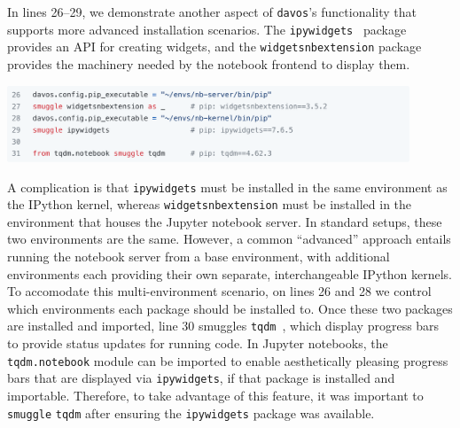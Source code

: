 \documentclass[preprint,12pt,a4paper]{elsarticle}
\begin{document}
In lines 26--29, we demonstrate another aspect of \texttt{davos}'s
functionality that supports more advanced installation scenarios.  The
\texttt{ipywidgets}~\cite{FredEtal15} package provides an API for
creating widgets, and the \texttt{widgetsnbextension} package provides
the machinery needed by the notebook frontend to display them.
\begin{center}
\includegraphics[width=0.9\textwidth]{figs/example6}
\end{center}
A complication is that \texttt{ipywidgets} must be installed in the
same environment as the IPython kernel, whereas
\texttt{widgetsnbextension} must be installed in the environment that
houses the Jupyter notebook server. In standard setups, these two
environments are the same.  However, a common ``advanced'' approach
entails running the notebook server from a base environment, with
additional environments each providing their own separate,
interchangeable IPython kernels.  To accomodate this multi-environment
scenario, on lines 26 and 28 we control which environments each
package should be installed to.  Once these two packages are installed
and imported, line 30 smuggles \texttt{tqdm}~\cite{daCoEtal22}, which
display progress bars to provide status updates for running code. In
Jupyter notebooks, the \texttt{tqdm.notebook} module can be imported
to enable aesthetically pleasing progress bars that are displayed via
\texttt{ipywidgets}, if that package is installed and
importable. Therefore, to take advantage of this feature, it was
important to \texttt{smuggle} \texttt{tqdm} after ensuring the
\texttt{ipywidgets} package was available.
\end{document}
